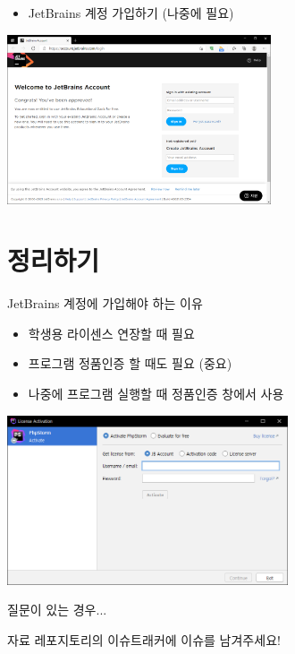 \documentclass{beamer}
\begin{document}
    \begin{frame}
        \begin{itemize}
            \item JetBrains 계정 가입하기 (나중에 필요)
        \end{itemize}
        \begin{center}
            \includegraphics[height=5cm]{Images/jetbrains-8.png}
        \end{center}
    \end{frame}
\section{정리하기}
    \begin{frame}{JetBrains 계정에 가입해야 하는 이유}
        \begin{itemize}
            \item 학생용 라이센스 연장할 때 필요
            \item 프로그램 정품인증 할 때도 필요 (중요)
        \end{itemize}
    \end{frame}
    \begin{frame}
        \begin{itemize}
            \item 나중에 프로그램 실행할 때 정품인증 창에서 사용
        \end{itemize}
        \begin{center}
            \includegraphics[height=5cm]{Images/jetbrains-9.png}
        \end{center}
    \end{frame}
    \begin{frame}{질문이 있는 경우...}
        \begin{center}
            자료 레포지토리의 이슈트래커에 이슈를 남겨주세요!
        \end{center}
    \end{frame}
\end{document}
